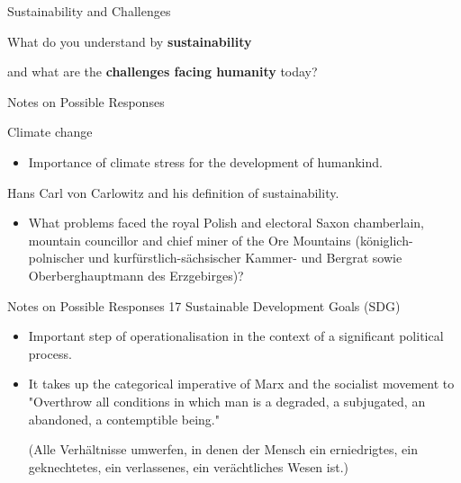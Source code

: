 \documentclass{beamer}
\title{Modelling Sustainable Systems\\ and Semantic Web\\[6pt]
  Systems and Sustainability
  \vskip1em}
\subtitle{Lecture in the Module 10-202-2309\\ for Master Computer Science}
\author{Prof. Dr. Hans-Gert Gräbe\\
\url{http://www.informatik.uni-leipzig.de/~graebe}}
\date{October 2021}
\begin{document}
{
\begin{frame}
  \titlepage
\end{frame}}

\begin{frame}{Sustainability and Challenges}\LARGE

  What do you understand by \textbf{sustainability}

  and what are the \textbf{challenges facing humanity} today? 

\end{frame}

\begin{frame}{Notes on Possible Responses}

Climate change
\begin{itemize}
\item Importance of climate stress for the development of humankind.
\end{itemize}

Hans Carl von Carlowitz and his definition of sustainability.
\begin{itemize}
\item What problems faced the royal Polish and electoral Saxon chamberlain,
  mountain councillor and chief miner of the Ore Mountains
  (königlich-polnischer und kurfürstlich-sächsischer Kammer- und Bergrat sowie
  Oberberghauptmann des Erzgebirges)?
\end{itemize}
\end{frame}

\begin{frame}{Notes on Possible Responses}
17 Sustainable Development Goals (SDG) 
\begin{itemize}
\item Important step of operationalisation in the context of a significant
  political process.
\item It takes up the categorical imperative of Marx and the socialist
  movement to "Overthrow all conditions in which man is a degraded, a
  subjugated, an abandoned, a contemptible being."\medskip

  (Alle Verhältnisse umwerfen, in denen der Mensch ein erniedrigtes, ein
  geknechtetes, ein verlassenes, ein verächtliches Wesen ist.)
\end{itemize}
\end{frame}
\end{document}
